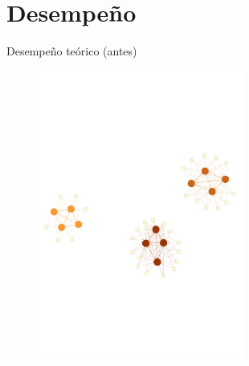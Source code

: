\documentclass{beamer}
\begin{document}
\section{Desempeño}

\begin{frame}{Desempeño teórico (antes)}
	\begin{figure}
		\centering
		\includegraphics[width=0.6\textwidth, clip = true, trim = 0 0 0 80]{imagenes/disconexo.pdf}
	\end{figure}
\end{frame}
\end{document}
